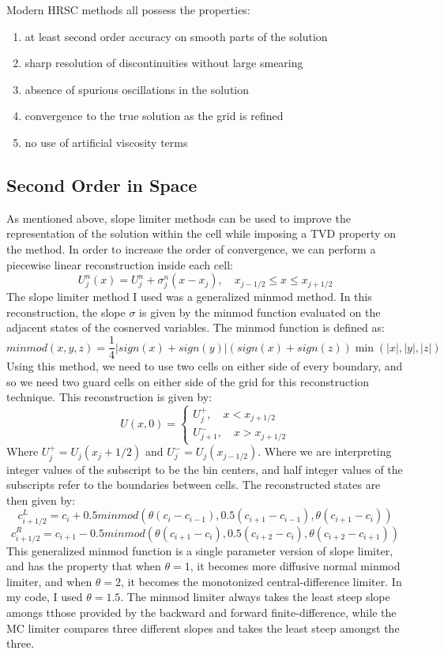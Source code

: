 Modern HRSC methods all possess the properties:
\begin{enumerate}
        \item at least second order accuracy on smooth parts of the solution
        \item sharp resolution of discontinuities without large smearing
        \item absence of spurious oscillations in the solution
        \item convergence to the true solution as the grid is refined
        \item no use of artificial viscosity terms 
\end{enumerate}
\subsection{Second Order in Space}
As mentioned above, slope limiter methods can be used to improve the representation of the solution within the cell while imposing a TVD property on the method. In order to increase the order of convergence, we can perform a piecewise linear reconstruction inside each cell:
$$U_j^n(x)=U_j^n+\sigma_j^n(x-x_j),\quad x_{j-1/2}\leq x \leq x_{j+1/2}$$
The slope limiter method I used was a generalized minmod method. In this reconstruction, the slope $\sigma$ is given by the minmod function evaluated on the adjacent states of the cosnerved variables. The minmod function is defined as:
$$minmod(x,y,z)=\frac{1}{4}|sign(x)+sign(y)|(sign(x)+sign(z))\min(|x|,|y|,|z|)$$
Using this method, we need to use two cells on either side of every boundary, and so we need two guard cells on either side of the grid for this reconstruction technique. This reconstruction is given by:
\[U(x,0)=\begin{cases}
                U_j^+ , \quad x < x_{j+1/2}\\
                U_{j+1}^- ,\quad x > x_{j+1/2}
        \end{cases}\]
Where $U_{j}^{+}=U_j(x_j+1/2)$ and $U_j^{-}=U_j(x_{j-1/2})$. Where we are interpreting integer values of the subscript to be the bin centers, and half integer values of the subscripts refer to the boundaries between cells. The reconstructed states are then given by:
$$c_{i+1/2}^{L}=c_i+0.5 minmod(\theta(c_i-c_{i-1}),0.5(c_{i+1}-c_{i-1}),\theta(c_{i+1}-c_i))$$
$$c_{i+1/2}^{R}=c_{i+1}-0.5 minmod(\theta(c_{i+1}-c_{i}),0.5(c_{i+2}-c_{i}),\theta(c_{i+2}-c_{i+1}))$$
This generalized minmod function is a single parameter version of slope limiter, and has the property that when $\theta=1$, it becomes more diffusive normal minmod limiter, and when $\theta=2$, it becomes the monotonized central-difference limiter. In my code, I used $\theta=1.5$. The minmod limiter always takes the least steep slope amongs tthose provided by the backward and forward finite-difference, while the MC limiter compares three different slopes and takes the least steep amongst the three. 

